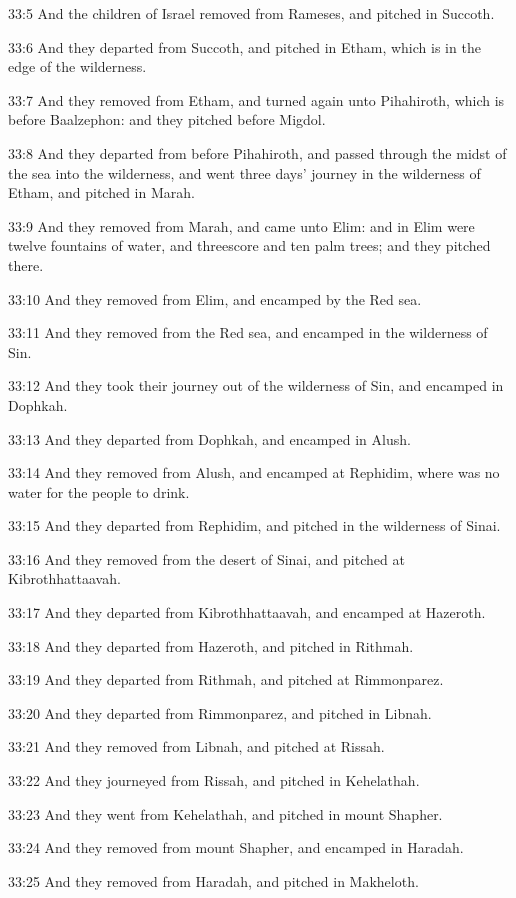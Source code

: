 33:5 And the children of Israel removed from Rameses, and pitched in Succoth.

33:6 And they departed from Succoth, and pitched in Etham, which is in the edge of the wilderness.

33:7 And they removed from Etham, and turned again unto Pihahiroth, which is before Baalzephon: and they pitched before Migdol.

33:8 And they departed from before Pihahiroth, and passed through the midst of the sea into the wilderness, and went three days' journey in the wilderness of Etham, and pitched in Marah.

33:9 And they removed from Marah, and came unto Elim: and in Elim were twelve fountains of water, and threescore and ten palm trees; and they pitched there.

33:10 And they removed from Elim, and encamped by the Red sea.

33:11 And they removed from the Red sea, and encamped in the wilderness of Sin.

33:12 And they took their journey out of the wilderness of Sin, and encamped in Dophkah.

33:13 And they departed from Dophkah, and encamped in Alush.

33:14 And they removed from Alush, and encamped at Rephidim, where was no water for the people to drink.

33:15 And they departed from Rephidim, and pitched in the wilderness of Sinai.

33:16 And they removed from the desert of Sinai, and pitched at Kibrothhattaavah.

33:17 And they departed from Kibrothhattaavah, and encamped at Hazeroth.

33:18 And they departed from Hazeroth, and pitched in Rithmah.

33:19 And they departed from Rithmah, and pitched at Rimmonparez.

33:20 And they departed from Rimmonparez, and pitched in Libnah.

33:21 And they removed from Libnah, and pitched at Rissah.

33:22 And they journeyed from Rissah, and pitched in Kehelathah.

33:23 And they went from Kehelathah, and pitched in mount Shapher.

33:24 And they removed from mount Shapher, and encamped in Haradah.

33:25 And they removed from Haradah, and pitched in Makheloth.

